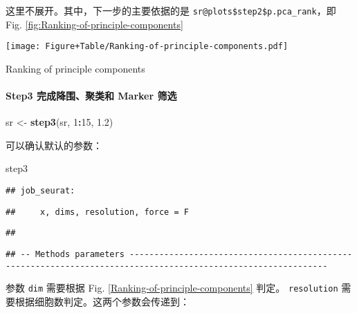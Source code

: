 \documentclass[
]{article}
\newenvironment{Shaded}{\begin{snugshade}}{\end{snugshade}}
\newcommand{\DecValTok}[1]{\textcolor[rgb]{0.00,0.00,0.81}{#1}}
\newcommand{\FloatTok}[1]{\textcolor[rgb]{0.00,0.00,0.81}{#1}}
\newcommand{\KeywordTok}[1]{\textcolor[rgb]{0.13,0.29,0.53}{\textbf{#1}}}
\newcommand{\NormalTok}[1]{#1}
\newcommand{\OperatorTok}[1]{\textcolor[rgb]{0.81,0.36,0.00}{\textbf{#1}}}
\newcommand{\StringTok}[1]{\textcolor[rgb]{0.31,0.60,0.02}{#1}}
\begin{document}
这里不展开。其中，下一步的主要依据的是 \texttt{sr@plots\$step2\$p.pca\_rank}，即 Fig. \ref{fig:Ranking-of-principle-components}

\def\@captype{figure}
\begin{center}
\texttt{[image: Figure+Table/Ranking-of-principle-components.pdf]}
\caption{Ranking of principle components}\label{fig:Ranking-of-principle-components}
\end{center}

\hypertarget{step3-ux5b8cux6210ux964dux56f4ux805aux7c7bux548c-marker-ux7b5bux9009}{%
\paragraph{Step3 完成降围、聚类和 Marker 筛选}\label{step3-ux5b8cux6210ux964dux56f4ux805aux7c7bux548c-marker-ux7b5bux9009}}

\begin{Shaded}
\begin{Highlighting}[]
\NormalTok{sr \textless{}{-}}\StringTok{ }\KeywordTok{step3}\NormalTok{(sr, }\DecValTok{1}\OperatorTok{:}\DecValTok{15}\NormalTok{, }\FloatTok{1.2}\NormalTok{)}
\end{Highlighting}
\end{Shaded}

可以确认默认的参数：

\begin{Shaded}
\begin{Highlighting}[]
\NormalTok{step3}
\end{Highlighting}
\end{Shaded}

\begin{verbatim}
## job_seurat:
\end{verbatim}

\begin{verbatim}
##     x, dims, resolution, force = F
\end{verbatim}

\begin{verbatim}
## 
\end{verbatim}

\begin{verbatim}
## -- Methods parameters --------------------------------------------------------------------------------------------------------------
\end{verbatim}

参数 \texttt{dim} 需要根据 Fig. \ref{Ranking-of-principle-components} 判定。
\texttt{resolution} 需要根据细胞数判定。这两个参数会传递到：
\end{document}
